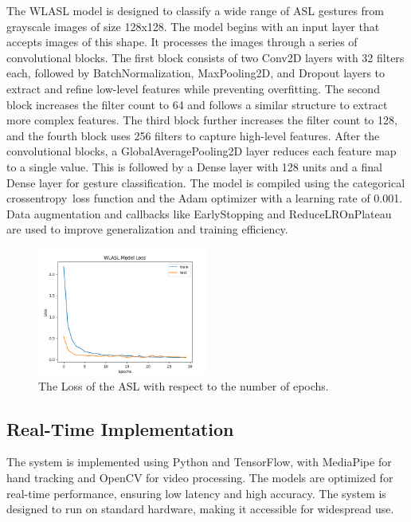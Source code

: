 \documentclass{article}
\begin{document}
The WLASL model is designed to classify a wide range of ASL gestures from grayscale images of size 128x128. The model begins with an input layer that accepts images of this shape. It processes the images through a series of convolutional blocks. The first block consists of two Conv2D layers with 32 filters each, followed by BatchNormalization, MaxPooling2D, and Dropout layers to extract and refine low-level features while preventing overfitting. The second block increases the filter count to 64 and follows a similar structure to extract more complex features. The third block further increases the filter count to 128, and the fourth block uses 256 filters to capture high-level features. After the convolutional blocks, a GlobalAveragePooling2D layer reduces each feature map to a single value. This is followed by a Dense layer with 128 units and a final Dense layer for gesture classification. The model is compiled using the categorical crossentropy\ loss function and the Adam optimizer with a learning rate of 0.001. Data augmentation and callbacks like EarlyStopping and ReduceLROnPlateau are used to improve generalization and training efficiency.

\begin{figure}[h]
	\centering
	\includegraphics[width=0.5\textwidth]{figures/wlasl-model.png} %
	\caption{The Loss of the ASL  with respect to the number of epochs.}
	\label{fig:wlsal-model} %
\end{figure}


\subsection{Real-Time Implementation}
The system is implemented using Python and TensorFlow, with MediaPipe for hand tracking and OpenCV for video processing. The models are optimized for real-time performance, ensuring low latency and high accuracy. The system is designed to run on standard hardware, making it accessible for widespread use.
\end{document}
